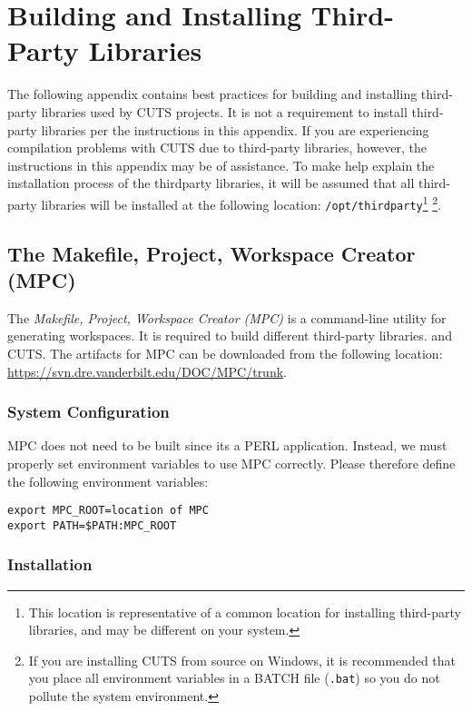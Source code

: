 
\chapter{Building and Installing Third-Party Libraries}
\label{chap:thirdparty}

The following appendix contains best practices for building
and installing third-party libraries used by CUTS projects. It is not
a requirement to install third-party libraries per the instructions in
this appendix. If you are experiencing compilation problems with CUTS
due to third-party libraries, however, the instructions in this appendix
may be of assistance. To make help explain the installation process
of the thirdparty libraries, it will be assumed that all third-party
libraries will be installed at the following location:
\texttt{/opt/thirdparty}\footnote{This location is representative 
of a common location for installing third-party libraries, and may
be different on your system.} \footnote{If you are installing CUTS
from source on Windows, it is recommended that you place all environment
variables in a BATCH file (\texttt{.bat}) so you do not pollute the
system environment.}.

\section{The Makefile, Project, Workspace Creator (MPC)}
\label{sec:thirdparty-mpc}

The \textit{Makefile, Project, Workspace Creator (MPC)} is a 
command-line utility for generating workspaces. It is required
to build different third-party libraries. and CUTS. The artifacts
for MPC can be downloaded from the following location: 
\url{https://svn.dre.vanderbilt.edu/DOC/MPC/trunk}. 

\subsection{System Configuration}

MPC does not need to be built since its a PERL application. Instead,
we must properly set environment variables to use MPC correctly. Please
therefore define the following environment variables:
\begin{lstlisting}
export MPC_ROOT=location of MPC
export PATH=$PATH:MPC_ROOT
\end{lstlisting}

\subsection{Installation}

